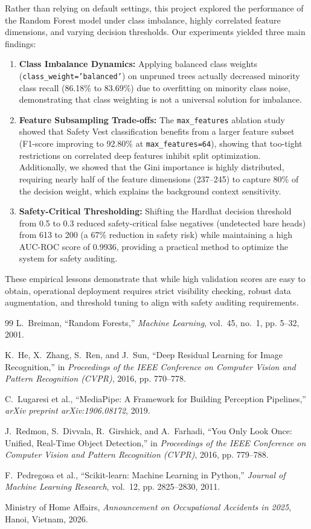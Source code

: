 \documentclass[11pt,a4paper]{article}
\begin{document}
Rather than relying on default settings, this project explored the performance of the Random Forest model under class imbalance, highly correlated feature dimensions, and varying decision thresholds. Our experiments yielded three main findings:
\begin{enumerate}
\item \textbf{Class Imbalance Dynamics:} Applying balanced class weights (\texttt{class\_weight='balanced'}) on unpruned trees actually decreased minority class recall (86.18\% to 83.69\%) due to overfitting on minority class noise, demonstrating that class weighting is not a universal solution for imbalance.
\item \textbf{Feature Subsampling Trade-offs:} The \texttt{max\_features} ablation study showed that Safety Vest classification benefits from a larger feature subset (F1-score improving to 92.80\% at \texttt{max\_features=64}), showing that too-tight restrictions on correlated deep features inhibit split optimization. Additionally, we showed that the Gini importance is highly distributed, requiring nearly half of the feature dimensions (237--245) to capture 80\% of the decision weight, which explains the background context sensitivity.
\item \textbf{Safety-Critical Thresholding:} Shifting the Hardhat decision threshold from 0.5 to 0.3 reduced safety-critical false negatives (undetected bare heads) from 613 to 200 (a 67\% reduction in safety risk) while maintaining a high AUC-ROC score of 0.9936, providing a practical method to optimize the system for safety auditing.
\end{enumerate}

These empirical lessons demonstrate that while high validation scores are easy to obtain, operational deployment requires strict visibility checking, robust data augmentation, and threshold tuning to align with safety auditing requirements.
\begin{thebibliography}{99}
L.~Breiman, ``Random Forests,'' \emph{Machine Learning}, vol.~45, no.~1, pp. 5--32, 2001.

K.~He, X.~Zhang, S.~Ren, and J.~Sun, ``Deep Residual Learning for Image Recognition,'' in \emph{Proceedings of the IEEE Conference on Computer Vision and Pattern Recognition (CVPR)}, 2016, pp. 770--778.

C.~Lugaresi et al., ``MediaPipe: A Framework for Building Perception Pipelines,'' \emph{arXiv preprint arXiv:1906.08172}, 2019.

J.~Redmon, S.~Divvala, R.~Girshick, and A.~Farhadi, ``You Only Look Once: Unified, Real-Time Object Detection,'' in \emph{Proceedings of the IEEE Conference on Computer Vision and Pattern Recognition (CVPR)}, 2016, pp. 779--788.

F.~Pedregosa et al., ``Scikit-learn: Machine Learning in Python,'' \emph{Journal of Machine Learning Research}, vol.~12, pp. 2825--2830, 2011.

Ministry of Home Affairs, \emph{Announcement on Occupational Accidents in 2025}, Hanoi, Vietnam, 2026.
\end{thebibliography}
\end{document}
